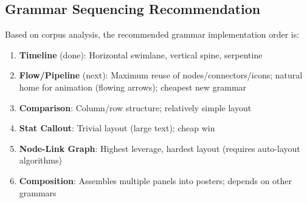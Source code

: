 \subsection{Grammar Sequencing Recommendation}

Based on corpus analysis, the recommended grammar implementation order is:

\begin{enumerate}
  \item \textbf{Timeline} (done): Horizontal swimlane, vertical spine, serpentine
  \item \textbf{Flow/Pipeline} (next): Maximum reuse of nodes/connectors/icons; natural home for animation (flowing arrows); cheapest new grammar
  \item \textbf{Comparison}: Column/row structure; relatively simple layout
  \item \textbf{Stat Callout}: Trivial layout (large text); cheap win
  \item \textbf{Node-Link Graph}: Highest leverage, hardest layout (requires auto-layout algorithms)
  \item \textbf{Composition}: Assembles multiple panels into posters; depends on other grammars
\end{enumerate}
